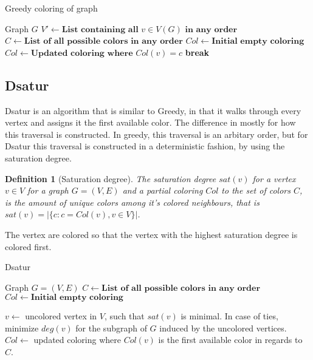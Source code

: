 \documentclass{amsart}
\newtheorem{definition}{Definition}[section]
\newcommand{\algorithmicbreak}{\textbf{break}}
\newcommand{\BREAK}{\STATE \algorithmicbreak}
\begin{document}
\begin{algorithm}[H]
  \caption{Greedy coloring of graph}
  \label{alg:modmin}
  \begin{algorithmic}[1]
    \REQUIRE Graph $G$
      \STATE $V' \leftarrow \textbf{List containing all $v \in V(G)$ in any order}$
      \STATE $C \leftarrow \textbf{List of all possible colors in any order}$
      \STATE $Col \leftarrow \textbf{Initial empty coloring}$
                \STATE $Col \leftarrow \textbf{Updated coloring where $Col(v) =
                c$}$
                \BREAK
            \ENDIF
        \ENDFOR
    \ENDFOR
  \end{algorithmic}
\end{algorithm}
\subsection{Dsatur}

Dsatur is an algorithm that is similar to Greedy, in that it walks through every
vertex and assigns it the first available color. The difference in mostly for
how this traversal is constructed. In greedy, this traversal is an arbitary
order, but for Dsatur this traversal is constructed in a deterministic fashion,
by using the saturation degree.

\begin{definition}[Saturation degree]
    The saturation degree $sat(v)$ for a vertex $v \in V$ for a graph $G =
    (V,E)$ and a partial coloring $Col$ to the set of colors $C$, is the amount of unique colors among
    it's colored neighbours, that is $sat(v) = |\{c  : c = Col(v), v \in V \}|$.
\end{definition}

The vertex are colored so that the vertex with the highest saturation degree is
colored first.

\begin{algorithm}[H]
  \caption{Dsatur}
  \label{alg:modmin}
  \begin{algorithmic}[1]
      \REQUIRE Graph $G = (V,E)$
      \STATE $C \leftarrow \textbf{List of all possible colors in any order}$
      \STATE $Col \leftarrow \textbf{Initial empty coloring}$


        \STATE $v \leftarrow$ uncolored vertex in $V$, such that $sat(v)$ is
        minimal. In case of ties, minimize $deg(v)$ for the subgraph of $G$
        induced by the uncolored vertices.
        \STATE $Col \leftarrow$ updated coloring where $Col(v)$ is the first
        available color in regards to $C$.
      \ENDFOR
  \end{algorithmic}
\end{algorithm}
\end{document}
